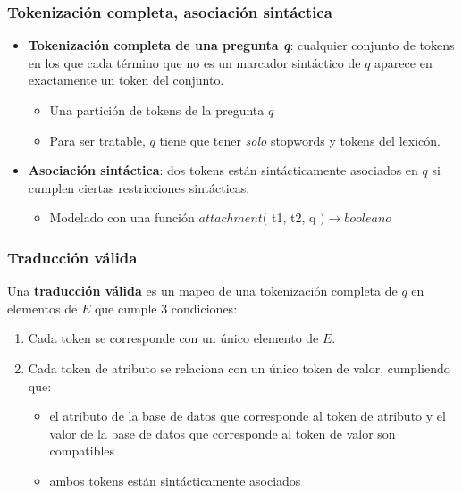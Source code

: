 \begin{frame}[<+->]
\frametitle{Tokenización completa, asociación sintáctica}

  \begin{itemize}
    \item \textbf{Tokenización completa de una pregunta \textit{q}}:  cualquier conjunto de tokens en los que cada término que no es un marcador sintáctico de $q$ aparece en exactamente un token del conjunto.
    \begin{itemize}
      \item Una partición de tokens de la pregunta $q$
      \item Para ser tratable, $q$ tiene que tener \textit{solo} stopwords y tokens del lexicón.
    \end{itemize} 
    \item \textbf{Asociación sintáctica}: dos tokens están sintácticamente asociados en $q$ si cumplen ciertas restricciones sintácticas.
    \begin{itemize}
      \item Modelado con una función $attachment($ t1, t2, q $) \rightarrow booleano$
    \end{itemize} 
   \end{itemize}
\end{frame}

\fontsize{9.5pt}{7.2}\selectfont
\begin{frame}[<+->]
\frametitle{Traducción válida}
 Una \textbf{traducción válida} es un mapeo de una tokenización completa de $q$ en elementos de $E$ que cumple 3 condiciones:
\begin{enumerate}
  \item Cada token se corresponde con un único elemento de $E$.
  \item Cada token de atributo se relaciona con un único token de valor, cumpliendo que:
  \begin{itemize}
    \fontsize{9.5pt}{7.2}\selectfont
    \item el atributo de la base de datos que corresponde al token de atributo y el valor de la base de datos que corresponde al token de valor son compatibles
    \item ambos tokens están sintácticamente asociados \footnotemark 
   \end{itemize}
\end{enumerate}
\end{frame}

